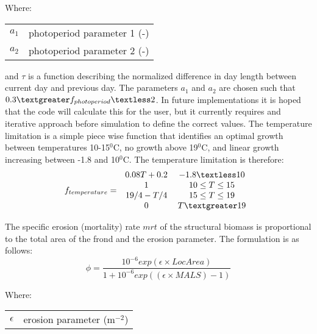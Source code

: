\documentclass{deltares_manual}
\begin{document}
Where:\\
\begin{tabular}{ll}
	$a_1$    & photoperiod parameter 1 (-)\\
	$a_2$    & photoperiod parameter 2 (-)\\
\end{tabular}
and $\tau$ is a function describing the normalized difference in day length between current day and previous day. The parameters $a_1$ and $a_2$ are chosen such that $0.3 \textgreater f_{photoperiod} \textless 2$. In future implementations it is hoped that the code will calculate this for the user, but it currently requires and iterative approach before simulation to define the correct values. 
The temperature limitation is a simple piece wise function that identifies an optimal growth between temperatures 10-15$^0$C, no growth above 19$^0$C, and linear growth increasing between -1.8 and 10$^0$C.  The temperature limitation is therefore:
\[f_{temperature} =  
\left 
.\begin{tabular}{cc}
$ 0.08T + 0.2 $    & $-1.8 \textless 10$ \\
$  1 $             & $10 \leq T \leq 15$ \\
$19/4 - T/4$       & $15 \leq T \leq 19$ \\ 
$0$                & $T \textgreater 19$ \\
\end{tabular}
\right 
.\]

The specific erosion (mortality) rate $mrt$ of the structural biomass is proportional to the total area of the frond and the erosion parameter. The formulation is as follows:
\[\phi = \frac{10^{-6}exp(\epsilon\times LocArea)}{1+10^{-6}exp((\epsilon\times MALS)-1)}\]

Where:\\
\begin{tabular}{ll}
$\epsilon$ & erosion parameter (m$^{-2}$)\\
\end{tabular}
\end{document}
